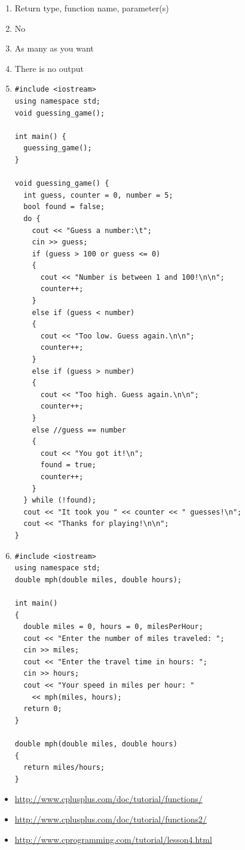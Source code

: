 \begin{enumerate}
	\item Return type, function name, parameter(s)
	\item No
	\item As many as you want
	\item There is no output
	\item 
\noindent\begin{minipage}{\linewidth}\begin{lstlisting}
#include <iostream>
using namespace std;
void guessing_game();

int main() {
  guessing_game();
}

void guessing_game() {
  int guess, counter = 0, number = 5;
  bool found = false;
  do {
    cout << "Guess a number:\t";
    cin >> guess;
    if (guess > 100 or guess <= 0)
    {
      cout << "Number is between 1 and 100!\n\n";
      counter++;
    }
    else if (guess < number)
    {
      cout << "Too low. Guess again.\n\n";
      counter++;
    }
    else if (guess > number)
    {
      cout << "Too high. Guess again.\n\n";
      counter++;
    }
    else //guess == number
    {
      cout << "You got it!\n";
      found = true;
      counter++;
    }
  } while (!found);
  cout << "It took you " << counter << " guesses!\n";
  cout << "Thanks for playing!\n\n";
}
\end{lstlisting}\end{minipage}

\item 
\noindent\begin{minipage}{\linewidth}\begin{lstlisting}
#include <iostream>
using namespace std;
double mph(double miles, double hours);

int main()
{
  double miles = 0, hours = 0, milesPerHour;
  cout << "Enter the number of miles traveled: ";
  cin >> miles;
  cout << "Enter the travel time in hours: ";
  cin >> hours;
  cout << "Your speed in miles per hour: " 
    << mph(miles, hours);
  return 0;
}

double mph(double miles, double hours)
{
  return miles/hours;
}
\end{lstlisting}\end{minipage}


\end{enumerate}




\begin{itemize}
\item \url{http://www.cplusplus.com/doc/tutorial/functions/}
\item \url{http://www.cplusplus.com/doc/tutorial/functions2/}
\item \url{http://www.cprogramming.com/tutorial/lesson4.html}
\end{itemize}	




